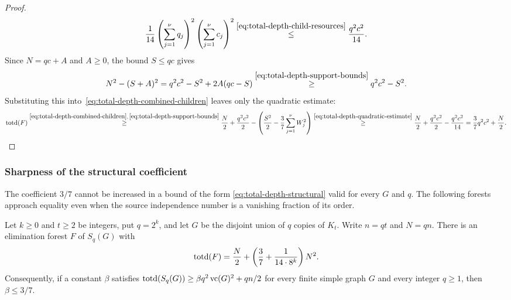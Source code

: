 \begin{proof}
\begin{equation}
 \frac1{14}\left(\sum_{j=1}^{\nu} q_j\right)^2\left(\sum_{j=1}^{\nu} c_j\right)^2
 \overset{\eqref{eq:total-depth-child-resources}}{\leq}\frac{q^2c^2}{14}.
\end{equation}
Since $N=qc+A$ and $A\geq0$, the bound $S\leq qc$ gives
\[
 N^2-(S+A)^2=q^2c^2-S^2+2A(qc-S)
 \overset{\eqref{eq:total-depth-support-bounds}}{\geq}q^2c^2-S^2.
\]
Substituting this into~\eqref{eq:total-depth-combined-children}
leaves only the quadratic estimate:
\[
 \operatorname{totd}(F)\overset{\eqref{eq:total-depth-combined-children},\,
 \eqref{eq:total-depth-support-bounds}}{\geq}
 \frac N2+\frac{q^2c^2}{2}
 -\left(\frac{S^2}{2}-\frac37\sum_{j=1}^{\nu} W_j^2\right)
 \overset{\eqref{eq:total-depth-quadratic-estimate}}{\geq}
 \frac N2+\frac{q^2c^2}{2}-\frac{q^2c^2}{14}
 =\frac37q^2c^2+\frac N2.
\]
\end{proof}

\subsubsection{Sharpness of the structural coefficient}

The coefficient $3/7$ cannot be increased in a bound of the form
\eqref{eq:total-depth-structural} valid for every $G$ and $q$.
The following forests approach equality even when the source
independence number is a vanishing fraction of its order.

\begin{proposition}\label{prop:total-depth-structural-sharpness}
Let $k\geq0$ and $t\geq2$ be integers, put $q=2^k$, and let $G$
be the disjoint union of $q$ copies of $K_t$. Write $n=qt$ and
$N=qn$. There is an elimination forest $F$ of $S_q(G)$ with
\[
 \operatorname{totd}(F)=\frac N2+
 \left(\frac37+\frac{1}{14\cdot8^k}\right)N^2.
\]
Consequently, if a constant $\beta$ satisfies
$\operatorname{totd}(S_q(G))\geq\beta q^2\operatorname{vc}(G)^2+qn/2$ for every finite simple
graph $G$ and every integer $q\geq1$, then $\beta\leq3/7$.
\end{proposition}

